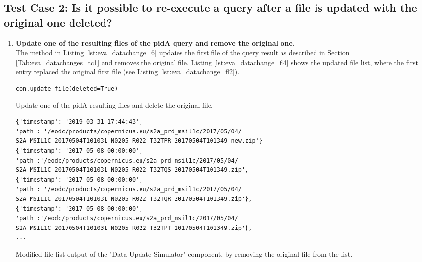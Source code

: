 \documentclass[draft,final]{vutinfth} %
\newenvironment{code}{\captionsetup{type=listing}}{}
\begin{document}
\subsection*{Test Case 2: Is it possible to re-execute a query after a file is updated with the original one deleted?}

\begin{enumerate}
	\setcounter{enumi}{+1}
	\item \textbf{Update one of the resulting files of the pidA query and remove the original one.}\\ 
	The method in Listing \ref{lst:eva_datachange_6} updates the first file of the query result as described in Section \ref{Tab:eva_datachanges_tc1} and removes the original file. Listing \ref{lst:eva_datachange_fl4} shows the updated file list, where the first entry replaced the original first file (see Listing \ref{lst:eva_datachange_fl2}).
	\begin{code}
	\begin{verbatim}
con.update_file(deleted=True)
	\end{verbatim}
	\caption{Update one of the pidA resulting files and delete the original file.}
	\label{lst:eva_datachange_6}
	\end{code}

\begin{code}
	\begin{verbatim} 
{'timestamp': '2019-03-31 17:44:43', 
'path': '/eodc/products/copernicus.eu/s2a_prd_msil1c/2017/05/04/
S2A_MSIL1C_20170504T101031_N0205_R022_T32TPR_20170504T101349_new.zip'}
{'timestamp': '2017-05-08 00:00:00',
'path':'/eodc/products/copernicus.eu/s2a_prd_msil1c/2017/05/04/
S2A_MSIL1C_20170504T101031_N0205_R022_T32TQS_20170504T101349.zip', 
{'timestamp': '2017-05-08 00:00:00', 
'path': '/eodc/products/copernicus.eu/s2a_prd_msil1c/2017/05/04/
S2A_MSIL1C_20170504T101031_N0205_R022_T32TQR_20170504T101349.zip'}, 
{'timestamp': '2017-05-08 00:00:00',
'path':'/eodc/products/copernicus.eu/s2a_prd_msil1c/2017/05/04/
S2A_MSIL1C_20170504T101031_N0205_R022_T32TPT_20170504T101349.zip'},
...
	\end{verbatim}
	\caption{Modified file list output of the "Data Update Simulator" component, by removing the original file from the list.}
	\label{lst:eva_datachange_fl4}
\end{code}	
	

\end{enumerate}
\end{document}
